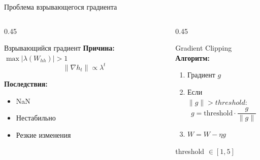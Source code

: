\documentclass[aspectratio=169, 10pt]{beamer}
\begin{document}
\begin{frame}{Проблема взрывающегося градиента}
  \begin{columns}[T]
    \begin{column}{0.45\textwidth}
      \begin{alertblock}{Взрывающийся градиент}
        \textbf{Причина:} $\max |\lambda(W_{hh})| > 1$         
        \[
          \left\| \nabla h_t \right\| \propto \lambda^{t}
        \]
        
        \textbf{Последствия:}
        \begin{itemize}
          \item NaN
          \item Нестабильно
          \item Резкие изменения
        \end{itemize}
      \end{alertblock}
    \end{column}
    
    \begin{column}{0.45\textwidth}
      \begin{exampleblock}{Gradient Clipping}
        \textbf{Алгоритм:}
        \begin{enumerate}
          \item Градиент $g$           \item Если $\|g\| > threshold$:
          \[
            g = \text{threshold} \cdot \frac{g}{\|g\|}
          \]
          \item $W = W - \eta g$         \end{enumerate}
        
        threshold $\in [1, 5]$       \end{exampleblock}
    \end{column}
  \end{columns}
\end{frame}
\end{document}
